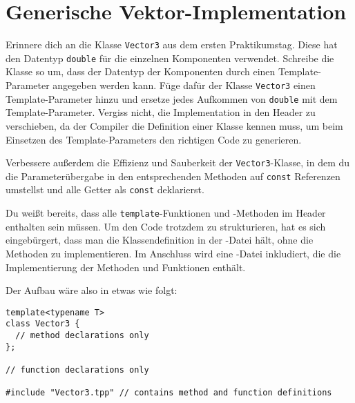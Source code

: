 \section{Generische Vektor-Implementation}
Erinnere dich an die Klasse \lstinline{Vector3} aus dem ersten Praktikumstag.
Diese hat den Datentyp \lstinline{double} für die einzelnen Komponenten verwendet.
Schreibe die Klasse so um, dass der Datentyp der Komponenten durch einen Template-Parameter angegeben werden kann.
Füge dafür der Klasse \lstinline{Vector3} einen Template-Parameter hinzu und ersetze jedes Aufkommen von \lstinline{double} mit dem Template-Parameter.
Vergiss nicht, die Implementation in den Header zu verschieben, da der Compiler die Definition einer Klasse kennen muss, um beim Einsetzen des Template-Parameters den richtigen Code zu generieren.

Verbessere außerdem die Effizienz und Sauberkeit der \lstinline{Vector3}-Klasse, in dem du die Parameterübergabe in den entsprechenden Methoden auf \lstinline{const} Referenzen umstellst und alle Getter als \lstinline{const} deklarierst.

Du weißt bereits, dass alle \lstinline{template}-Funktionen und -Methoden im Header enthalten sein müssen.
Um den Code trotzdem zu strukturieren, hat es sich eingebürgert, dass man die Klassendefinition in der -Datei hält, ohne die Methoden zu implementieren.
Im Anschluss wird eine -Datei inkludiert, die die Implementierung der Methoden und Funktionen enthält.
    
Der Aufbau wäre also in etwas wie folgt:
\begin{lstlisting}
template<typename T>
class Vector3 {
  // method declarations only
};

// function declarations only

#include "Vector3.tpp" // contains method and function definitions
\end{lstlisting}

